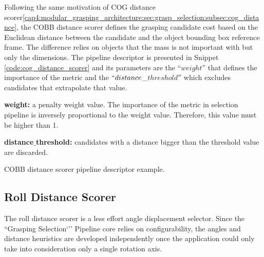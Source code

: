 Following the same motivation of \ac{COG} distance scorer\ref{cap4:modular_grasping_architecture:sec:grasp_selection:subsec:cog_distance}, the \ac{COBB} distance scorer defines the grasping candidate cost based on the Euclidean distance between the candidate and the object bounding box reference frame. The difference relies on objects that the mass is not important with but only the dimensions. The pipeline descriptor is presented in Snippet \ref{code:cog_distance_scorer} and its parameters are the ``$weight$'' that defines the importance of the metric and the $``distance$\_$threshold''$ which excludes candidates that extrapolate that value.

\begin{itemize_jp}
    \item \textbf{weight:} a penalty weight value. The importance of the metric in selection pipeline is inversely proportional to the weight value. Therefore, this value must be higher than 1.
    \item \textbf{distance$\_$threshold:} candidates with a distance bigger than the threshold value are discarded.
\end{itemize_jp}


\begin{snippet}[h!]
\centering
{}
\caption{\ac{COBB} distance scorer pipeline descriptor example.}
\label{code:cobb_distance_scorer}
\end{snippet}

\subsection{Roll Distance Scorer}
\label{cap4:modular_grasping_architecture:sec:grasp_selection:subsec:roll_distance}

The roll distance scorer is a less effort angle displacement selector. Since the ``Grasping Selection`'' Pipeline core relies on configurability, the angles and distance heuristics are developed independently once the application could only take into consideration only a single rotation axis.

